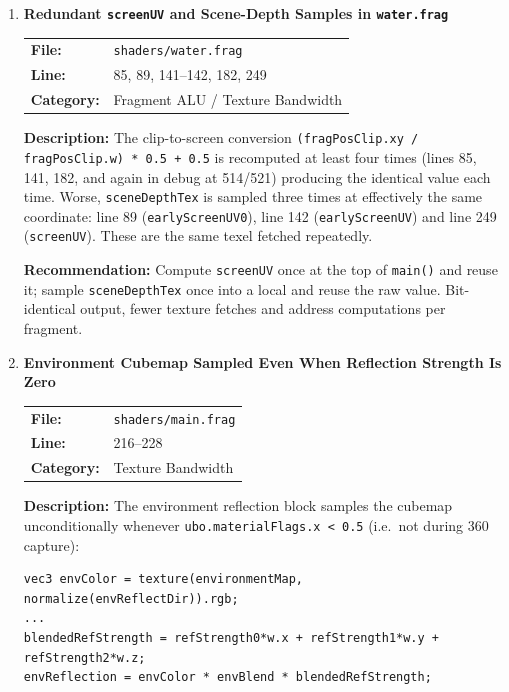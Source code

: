 \documentclass[a4paper,12pt]{article}
\newcommand{\severitybox}[2]{%
  \colorbox{#1}{\makebox[2.5cm][c]{\textcolor{white}{\textbf{#2}}}}%
}
\begin{document}
\begin{enumerate}[leftmargin=*]

\item[\textbf{[SH4]}] \textbf{Redundant \texttt{screenUV} and Scene-Depth Samples in \texttt{water.frag}}
  \hfill \severitybox{mediumcolor}{MEDIUM}

  \begin{tabular}{ll}
    \textbf{File:} & \texttt{shaders/water.frag} \\
    \textbf{Line:} & 85, 89, 141--142, 182, 249 \\
    \textbf{Category:} & Fragment ALU / Texture Bandwidth \\
  \end{tabular}

  \textbf{Description:}
  The clip-to-screen conversion
  \texttt{(fragPosClip.xy / fragPosClip.w) * 0.5 + 0.5} is recomputed at least
  four times (lines 85, 141, 182, and again in debug at 514/521) producing the
  identical value each time. Worse, \texttt{sceneDepthTex} is sampled three
  times at effectively the same coordinate: line 89 (\texttt{earlyScreenUV0}),
  line 142 (\texttt{earlyScreenUV}) and line 249 (\texttt{screenUV}). These are
  the same texel fetched repeatedly.

  \textbf{Recommendation:}
  Compute \texttt{screenUV} once at the top of \texttt{main()} and reuse it;
  sample \texttt{sceneDepthTex} once into a local and reuse the raw value.
  Bit-identical output, fewer texture fetches and address computations per
  fragment.

\item[\textbf{[SH5]}] \textbf{Environment Cubemap Sampled Even When Reflection Strength Is Zero}
  \hfill \severitybox{mediumcolor}{MEDIUM}

  \begin{tabular}{ll}
    \textbf{File:} & \texttt{shaders/main.frag} \\
    \textbf{Line:} & 216--228 \\
    \textbf{Category:} & Texture Bandwidth \\
  \end{tabular}

  \textbf{Description:}
  The environment reflection block samples the cubemap unconditionally whenever
  \texttt{ubo.materialFlags.x < 0.5} (i.e.\ not during 360 capture):

\begin{lstlisting}
vec3 envColor = texture(environmentMap, normalize(envReflectDir)).rgb;
...
blendedRefStrength = refStrength0*w.x + refStrength1*w.y + refStrength2*w.z;
envReflection = envColor * envBlend * blendedRefStrength;
\end{lstlisting}


\end{enumerate}
\end{document}
